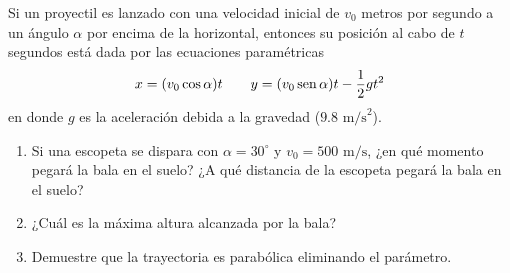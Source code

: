 \item Si un proyectil es lanzado con una velocidad inicial de $v_0$ metros por segundo a un ángulo $\alpha$ por encima de la horizontal, entonces su posición al cabo de $t$ segundos está dada por las ecuaciones paramétricas
    \[ x = (v_0 \cos \alpha)t \qquad y = (v_0 \operatorname{sen} \alpha)t - \frac{1}{2}gt^2 \]
    en donde $g$ es la aceleración debida a la gravedad ($9.8 \text{ m/s}^2$).
    \begin{enumerate}
        \item[(a)] Si una escopeta se dispara con $\alpha = 30^\circ$ y $v_0 = 500 \text{ m/s}$, ¿en qué momento pegará la bala en el suelo? ¿A qué distancia de la escopeta pegará la bala en el suelo?
        \item[(b)] ¿Cuál es la máxima altura alcanzada por la bala?
        \item[(c)] Demuestre que la trayectoria es parabólica eliminando el parámetro.
    \end{enumerate}
